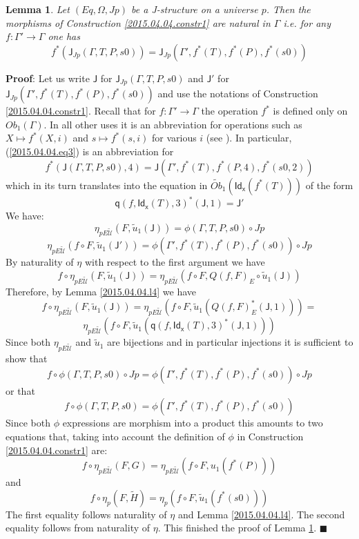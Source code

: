 \documentclass[12pt]{article}
\numberwithin{equation}{section}
\newenvironment{eq}{\begin{equation}}{\end{equation}}
\newenvironment{myproof}{{\bf Proof}:}{$\blacksquare$ \vskip 5mm }
\newtheorem{lemma}[proposition]{Lemma}
\newcommand{\llabel}[1]{\label{#1}}
\newcommand{\sr}{\rightarrow}
\newcommand{\wt}{\widetilde}
\newcommand{\q}{\mathsf{q}}
\newcommand{\J}{\mathsf{J}}
\newcommand{\Idx}{\mathsf{Id_x}} %
\newcommand{\U}{\mathcal{U}}
\begin{document}
%
\begin{lemma}
\llabel{2015.04.04.l1} Let $(Eq,\Omega,Jp)$ be a J-structure on a universe
$p$. Then the morphisms of Construction \ref{2015.04.04.constr1} are natural in
$\Gamma$ i.e. for any $f:\Gamma'\sr \Gamma$ one has
%
\begin{eq}\llabel{2015.04.04.eq3}
f^*(\J_{Jp}(\Gamma,T,P,s0))=\J_{Jp}(\Gamma',f^*(T),f^*(P),f^*(s0))
\end{eq}
%
\end{lemma}
%
\begin{myproof}
Let us write $\J$ for $\J_{Jp}(\Gamma,T,P,s0)$ and $\J'$ for
$\J_{Jp}(\Gamma',f^*(T),f^*(P),f^*(s0))$ and use the notations of Construction
\ref{2015.04.04.constr1}. Recall that for $f:\Gamma'\sr \Gamma$ the operation
$f^*$ is defined only on $Ob_1(\Gamma)$. In all other uses it is an
abbreviation for operations such as $X\mapsto f^*(X,i)$ and $s\mapsto f^*(s,i)$
for various $i$ (see \cite{Csubsystems}). In particular, (\ref{2015.04.04.eq3})
is an abbreviation for
%
$$f^*(\J(\Gamma,T,P,s0),4)=\J(\Gamma',f^*(T),f^*(P,4),f^*(s0,2))$$
%
which in its turn translates into the equation in $\wt{Ob}_1(\Idx(f^*(T)))$ of
the form
%
$$\q(f,\Idx(T),3)^*(\J,1)=\J'$$
%
We have:
%
$$\eta_{pE\wt{\U}}(F,\wt{u}_1(\J))=\phi(\Gamma,T,P,s0)\circ Jp$$
$$\eta_{pE\wt{\U}}(f\circ F,
\wt{u}_1(\J'))=\phi(\Gamma',f^*(T),f^*(P),f^*(s0))\circ Jp$$
%
By naturality of $\eta$ with respect to the first argument we have
%
$$f\circ \eta_{pE\wt{\U}}(F,\wt{u}_1(\J))=\eta_{pE\wt{\U}}(f\circ F,
Q(f,F)_{E}\circ \wt{u}_1(\J))$$
%
Therefore, by Lemma \ref{2015.04.04.l4} we have
%
$$f\circ \eta_{pE\wt{\U}}(F,\wt{u}_1(\J))=\eta_{pE\wt{\U}}(f\circ F,
\wt{u}_1(Q(f,F)_{E}^*(\J,1)))=$$
$$\eta_{pE\wt{\U}}(f\circ F, \wt{u}_1(\q(f,\Idx(T),3)^*(\J,1)))$$
%
Since both $\eta_{pE\wt{\U}}$ and $\wt{u}_1$ are bijections and in particular
injections it is sufficient to show that
%
$$f\circ \phi(\Gamma,T,P,s0)\circ Jp = \phi(\Gamma',f^*(T),f^*(P),f^*(s0))\circ
Jp$$
%
or that
%
$$f\circ \phi(\Gamma,T,P,s0)=\phi(\Gamma',f^*(T),f^*(P),f^*(s0))$$
%
Since both $\phi$ expressions are morphism into a product this amounts to two
equations that, taking into account the definition of $\phi$ in Construction
\ref{2015.04.04.constr1} are:
%
$$f\circ \eta_{pE\wt{\U}}(F,G)=\eta_{pE\wt{\U}}(f\circ F, u_1(f^*(P)))$$
%
and
%
$$f\circ \eta_p(F,\wt{H})=\eta_p(f\circ F, \wt{u}_1(f^*(s0)))$$
%
The first equality follows naturality of $\eta$ and Lemma
\ref{2015.04.04.l4}. The second equality follows from naturality of
$\eta$. This finished the proof of Lemma \ref{2015.04.04.l1}.
\end{myproof}
\end{document}
